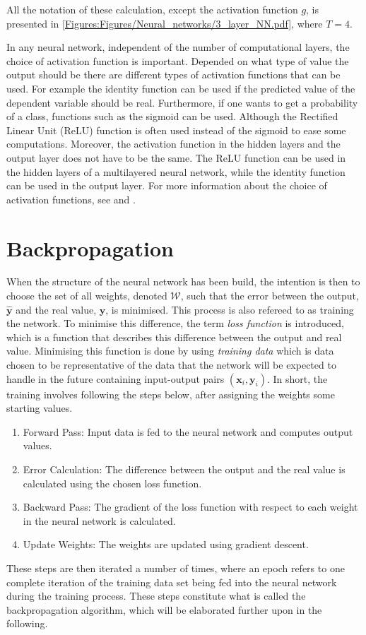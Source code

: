 All the notation of these calculation, except the activation function $g$, is presented in \autoref{Figures:Figures/Neural_networks/3_layer_NN.pdf}, where $T = 4$. 

In any neural network, independent of the number of computational layers, the choice of activation function is important. Depended on what type of value the output should be there are different types of activation functions that can be used. For example the identity function can be used if the predicted value of the dependent variable should be real. Furthermore, if one wants to get a probability of a class, functions such as the sigmoid can be used. Although the Rectified Linear Unit (ReLU) function is often used instead of the sigmoid to ease some computations. Moreover, the activation function in the hidden layers and the output layer does not have to be the same. The ReLU function can be used in the hidden layers of a multilayered neural network, while the identity function can be used in the output layer. For more information about the choice of activation functions, see \citep[p. 2-6]{NNDesign} and \citep[p. 11-13]{NNDL}.


\section{Backpropagation}
When the structure of the neural network has been build, the intention is then to choose the set of all weights, denoted $\mathcal{W}$, such that the error between the output, $\bm{\hat{y}}$ and the real value, $\bm{y}$, is minimised. This process is also refereed to as training the network. To minimise this difference, the term \emph{loss function} is introduced, which is a function that describes this difference between the output and real value. Minimising this function is done by using \emph{training data} which is data chosen to be representative of the data that the network will be expected to handle in the future containing input-output pairs $(\bm{x}_i,\bm{y}_i)$. In short, the training involves following the steps below, after assigning the weights some starting values.
\begin{enumerate}
    \item Forward Pass: Input data is fed to the neural network and computes output values. 
    \item Error Calculation: The difference between the output and the real value is calculated using the chosen loss function.
    \item Backward Pass: The gradient of the loss function with respect to each weight in the neural network is calculated.
    \item Update Weights: The weights are updated using gradient descent.
\end{enumerate}
These steps are then iterated a number of times, where an epoch refers to one complete iteration of the training data set being fed into the neural network during the training process. These steps constitute what is called the backpropagation algorithm, which will be elaborated further upon in the following. 

